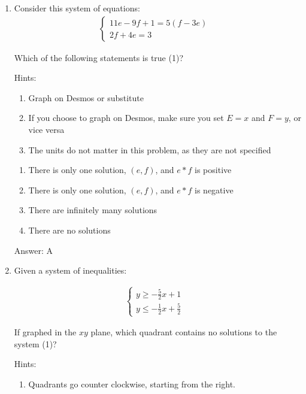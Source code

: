 \documentclass{article}
\begin{document}
\begin{enumerate}
{	      Answer: 0
	      }

	\item{Consider this system of equations:
	      \[
		      \begin{array}{l}
			      \begin{cases}
				      11e-9f+1=5(f-3e) & \\
				      2f+4e=3
			      \end{cases}
		      \end{array}
	      \]

	      Which of the following statements is true (1)?

	      Hints:
	      \begin{enumerate}
		      \item{Graph on Desmos or substitute}
		      \item{If you choose to graph on Desmos, make sure you set $E=x$ and $F=y$, or vice versa}
		      \item{The units do not matter in this problem, as they are not specified}
	      \end{enumerate}

	      \begin{enumerate}
		      \item{There is only one solution, $(e,f)$, and $e*f$ is positive}
		      \item{There is only one solution, $(e,f)$, and $e*f$ is negative}
		      \item{There are infinitely many solutions}
		      \item{There are no solutions}
	      \end{enumerate}

	      Answer: A
	      }

	\item {Given a system of inequalities:

	      \[
		      \begin{array}{l}
			      \begin{cases}
				      y\geq-\frac{5}{2}x+1 & \\
				      y\leq-\frac{1}{2}x+\frac{5}{2}
			      \end{cases}
		      \end{array}
	      \]

	      If graphed in the $xy$ plane, which quadrant contains no solutions to the system (1)?

	      Hints:
	      \begin{enumerate}
		      \item{Quadrants go counter clockwise, starting from the right.}
	      \end{enumerate}

}
\end{enumerate}
\end{document}
